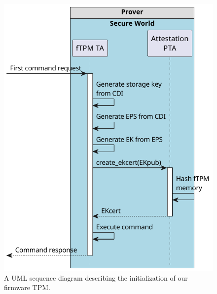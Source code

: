 \begin{figure}[htb]
  \centering
  \includegraphics[width=0.65\linewidth]{figures/tpm-initialization.pdf}
  \caption{A UML sequence diagram describing the initialization of our firmware TPM\@.}\label{fig:ftpm_initialization}
\end{figure}
